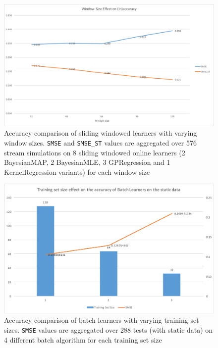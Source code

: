 \begin{figure}[htbp]
  \centering
    \includegraphics[width=\linewidth]{./Figures/ws_on_accuracy1.pdf}
  \caption{Accuracy comparison of sliding windowed learners with varying window sizes. \texttt{SMSE} and \texttt{SMSE\_ST} values are aggregated over 576 stream simulations on 8 sliding windowed online learners (2 BayesianMAP, 2 BayesianMLE, 3 GPRegression and 1 KernelRegression variants) for each window size}
  \label{fig:ws_on_accuracy1}
\end{figure}

\begin{figure}[htbp]
  \centering
    \includegraphics[width=\linewidth]{./Figures/batch_trainingsetsize_on_accuracy.pdf}
  \caption{Accuracy comparison of batch learners with varying training set sizes. \texttt{SMSE} values are aggregated over 288 tests (with static data) on 4 different batch algorithm for each training set size}
  \label{fig:batch_trainingsetsize_on_accuracy}
\end{figure}


